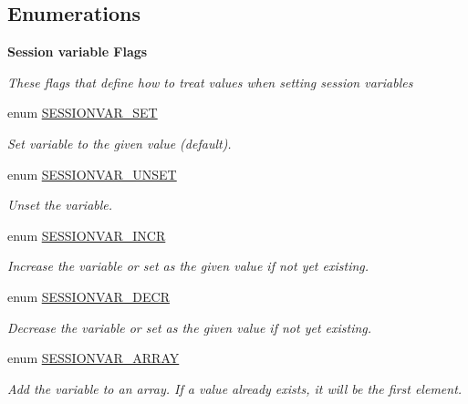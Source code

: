 \subsection*{Enumerations}
\begin{Indent}{\bf Session variable Flags}\par
{\em \label{_amgrp00dccbff5c763c2e3fd2c704f969c7a3}
 These flags that define how to treat values when setting session variables }\begin{DoxyCompactItemize}
\item 
enum \hyperlink{class_8sessionhandler_8php_af9e860b1663497a46177b0ec35d6a9f5}{SESSIONVAR\_\-SET} 
\begin{DoxyCompactList}\small\item\em Set variable to the given value (default). \item\end{DoxyCompactList}\item 
enum \hyperlink{class_8sessionhandler_8php_a5ac16a9e50c48935c45ceae46ffdc598}{SESSIONVAR\_\-UNSET} 
\begin{DoxyCompactList}\small\item\em Unset the variable. \item\end{DoxyCompactList}\item 
enum \hyperlink{class_8sessionhandler_8php_acf42fdbedc1bd30daaebadb12f63c75c}{SESSIONVAR\_\-INCR} 
\begin{DoxyCompactList}\small\item\em Increase the variable or set as the given value if not yet existing. \item\end{DoxyCompactList}\item 
enum \hyperlink{class_8sessionhandler_8php_a25d82db99af8d3372efbccb0917f33cb}{SESSIONVAR\_\-DECR} 
\begin{DoxyCompactList}\small\item\em Decrease the variable or set as the given value if not yet existing. \item\end{DoxyCompactList}\item 
enum \hyperlink{class_8sessionhandler_8php_a37ebf617beca75ce8d60f06b8c37423a}{SESSIONVAR\_\-ARRAY} 
\begin{DoxyCompactList}\small\item\em Add the variable to an array. If a value already exists, it will be the first element. \item\end{DoxyCompactList}\end{DoxyCompactItemize}
\end{Indent}


